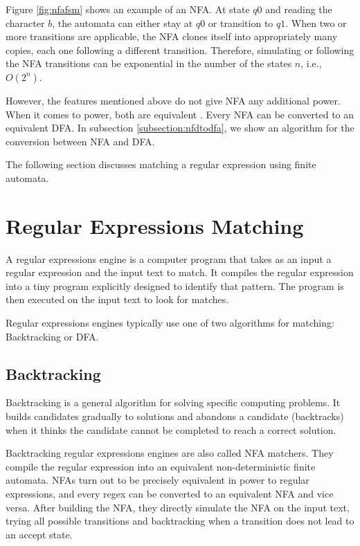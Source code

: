 Figure \ref{fig:nfafsm} shows an example of an NFA. At state $q0$ and reading the character $b$, the automata can either stay at $q0$ or transition to $q1$. When two or more transitions are applicable, the NFA clones itself into appropriately many copies, each one following a different transition. Therefore, simulating or following the NFA transitions can be exponential in the number of the states $n$, i.e., $O(2^{n})$.

However, the features mentioned above do not give NFA any additional power. When it comes to power, both are equivalent \cite{nfadfaeq}. Every NFA can be converted to an equivalent DFA. In subsection \ref{subsection:nfdtodfa}, we show an algorithm for the conversion between NFA and DFA.

The following section discusses matching a regular expression using finite automata.

\newpage
\section{Regular Expressions Matching}
A regular expressions engine is a computer program that takes as an input a regular expression and the input text to match. It compiles the regular expression into a tiny program explicitly designed to identify that pattern. The program is then executed on the input text to look for matches.

Regular expressions engines typically use one of two algorithms for matching: Backtracking or DFA.

\subsection{Backtracking}

Backtracking is a general algorithm for solving specific computing problems. It builds candidates gradually to solutions and abandons a candidate (backtracks) when it thinks the candidate cannot be completed to reach a correct solution.

Backtracking regular expressions engines are also called NFA matchers. They compile the regular expression into an equivalent non-deterministic finite automata. NFAs turn out to be precisely equivalent in power to regular expressions, and every regex can be converted to an equivalent NFA and vice versa. After building the NFA, they directly simulate the NFA on the input text, trying all possible transitions and backtracking when a transition does not lead to an accept state.

